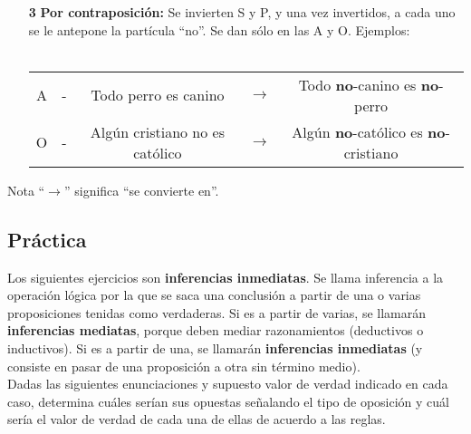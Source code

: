 \documentclass{article}
\begin{document}
\begin{enumerate}
\begin{itemize}
        \item[\textbf{3}] \textbf{Por contraposición:} Se invierten S y P, y una vez invertidos, a cada uno se le antepone la partícula ``no''. Se dan sólo en las A y O. Ejemplos: \\ \vspace{-1mm} \\
        \begin{tabular}{c c c c c}
            A & - & Todo perro es canino & $\longrightarrow$ & Todo \textbf{no}-canino es \textbf{no}-perro \\
            O & - & Algún cristiano no es católico & $\longrightarrow$ & Algún \textbf{no}-católico es \textbf{no}-cristiano
        \end{tabular}
    \end{itemize}

    Nota ``$\longrightarrow$'' significa ``se convierte en''.
    \end{enumerate}
    
    \newpage

\subsection{Práctica}
    
    Los siguientes ejercicios son \textbf{inferencias inmediatas}. Se llama inferencia a la operación lógica por la que se saca una conclusión a partir de una o varias proposiciones tenidas como verdaderas. Si es a partir de varias, se llamarán \textbf{inferencias mediatas}, porque deben mediar razonamientos (deductivos o inductivos). Si es a partir de una, se llamarán \textbf{inferencias inmediatas} (y consiste en pasar de una proposición a otra sin término medio). \\
    
    Dadas las siguientes enunciaciones y supuesto valor de verdad indicado en cada caso, determina cuáles serían sus opuestas señalando el tipo de oposición y cuál sería el valor de verdad de cada una de ellas de acuerdo a las reglas. \\
    
\end{document}
